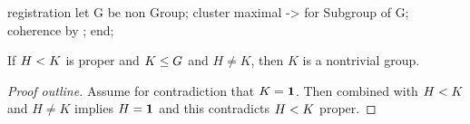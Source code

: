 \nwenddocs{}\endmoddef\nwstartdeflinemarkup{}\nwenddeflinemarkup
registration
  let G be non  Group;
  cluster maximal ->  for Subgroup of G;
  coherence by ;
end;
\nwendcode{}\nwdocspar

\begin{theorem}
If $H< K$ is proper and $K\leq G$ and $H\neq K$, then
$K$ is a nontrivial group.
\end{theorem}

\begin{proof}[Proof outline]
  Assume for contradiction that $K=\mathbf{1}$.
  Then combined with $H< K$ and $H\neq K$ implies
  $H=\mathbf{1}$ and this contradicts $H< K$ proper.
\end{proof}

